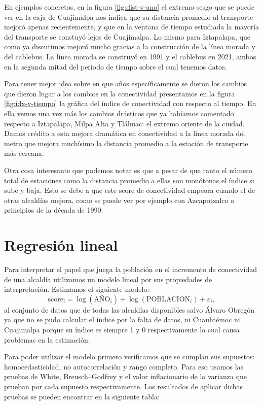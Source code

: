 \documentclass[
  spanish,
]{article}
\begin{document}
En ejemplos concretos, en la figura \ref{fig:dist-v-ano} el extremo
sesgo que se puede ver en la caja de Cuajimalpa nos indica que su
distancia promedio al transporte mejoró apenas recientemente, y que en
la ventana de tiempo estudiada la mayoría del transporte se constuyó
lejos de Cuajimalpa. Lo mismo para Iztapalapa, que como ya discutimos
mejoró mucho gracias a la construcción de la línea morada y del
cablebus. La linea morada se construyó en 1991 y el cablebus en 2021,
ambos en la segunda mitad del periodo de tiempo sobre el cual tenemos
datos.

Para tener mejor idea sobre en que años específicamente se dieron los
cambios que dieron lugar a los cambios en la conectividad presentamos en
la figura \ref{fig:idx-v-tiempo} la gráfica del índice de conectividad
con respecto al tiempo. En ella vemos una vez más los cambios drásticos
que ya habíamos comentado respecto a Iztapalapa, Milpa Alta y Tláhuac:
el extremo oriente de la ciudad. Damos crédito a esta mejora dramática
en conectividad a la linea morada del metro que mejora muchísimo la
distancia promedio a la estación de transporte más cercana.

Otra cosa interesante que podemos notar es que a pesar de que tanto el
número total de estaciones como la distancia promedio a ellas son
monótonas el índice si sube y baja. Esto se debe a que este score de
conectividad empeora cuando el de otras alcaldías mejora, como se puede
ver por ejemplo con Azcapotzalco a principios de la década de 1990.

\hypertarget{regresiuxf3n-lineal}{%
\section{Regresión lineal}\label{regresiuxf3n-lineal}}

Para interpretar el papel que juega la población en el incremento de
conectividad de una alcaldía utilizamos un modelo lineal por sus
propiedades de interpretación. Estimamos el siguiente modelo:
\begin{equation}
\text{score}_i = \log(\text{AÑO}_i) + \log(\text{POBLACION}_i) + \varepsilon_i,
\end{equation} al conjunto de datos que de todas las alcaldías
disponibles salvo Álvaro Obregón ya que no se pudo calcular el índice
por la falta de datos, ni Cuauhtémoc ni Cuajimalpa porque su índice es
siempre 1 y 0 respectivamente lo cual causa problemas en la estimación.

Para poder utilizar el modelo primero verificamos que se cumplan sus
supuestos: homocedasticidad, no autocorrelación y rango completo. Para
eso usamos las pruebas de White, Breusch--Godfrey y el valor
inflacionario de la varianza que prueban por cada supuesto
respectivamente. Los resultados de aplicar dichas pruebas se pueden
encontrar en la siguiente tabla:
\end{document}
